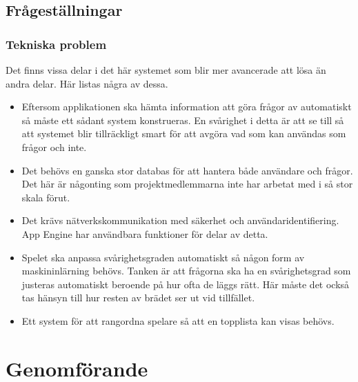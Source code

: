 \documentclass[12pt,a4paper]{article}
\begin{document}
\subsection{Frågeställningar}

\subsubsection{Tekniska problem}
Det finns vissa delar i det här systemet som blir mer avancerade att lösa än andra delar. Här listas några av dessa.
\begin{itemize}
\item Eftersom applikationen ska hämta information att göra frågor av automatiskt så måste ett sådant system konstrueras. En svårighet i detta är att se till så att systemet blir tillräckligt smart för att avgöra vad som kan användas som frågor och inte.
\item Det behövs en ganska stor databas för att hantera både användare och frågor. Det här är någonting som projektmedlemmarna inte har arbetat med i så stor skala förut.
\item Det krävs nätverkskommunikation med säkerhet och användaridentifiering. App Engine har användbara funktioner för delar av detta.
\item Spelet ska anpassa svårighetsgraden automatiskt så någon form av maskininlärning behövs. Tanken är att frågorna ska ha en svårighetsgrad som justeras automatiskt beroende på hur ofta de läggs rätt. Här måste det också tas hänsyn till hur resten av brädet ser ut vid tillfället.
\item Ett system för att rangordna spelare så att en topplista kan visas behövs.
\end{itemize}

\section{Genomförande}
\end{document}
